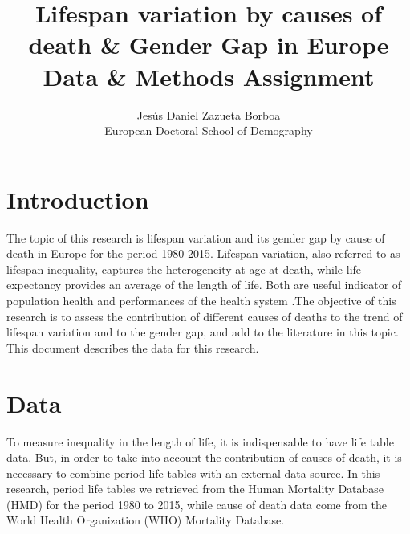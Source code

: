 \documentclass[12pt,a4paper]{article}
\begin{document}


\title{Lifespan variation by causes of death \& Gender Gap in Europe \\
        \small{Data \& Methods Assignment}}


\author{\large{Jesús Daniel Zazueta Borboa} \\ {\small{{European Doctoral School of Demography}}}}

\date{\small }
\maketitle
\vspace{-0.3in}


\section{Introduction}

The topic of this research is lifespan variation and its gender gap by cause of death in Europe for the period 1980-2015. Lifespan variation, also referred to as lifespan inequality, captures the heterogeneity at age at death, while life expectancy provides an average of the length of life. Both are useful indicator of population health and performances of the health system \citep{van18, JM2018-2}.The objective of this research is to assess the contribution of different causes of deaths to the trend of lifespan variation and to the gender gap, and add to the literature in this topic. This document describes the data for this research. 

\section{Data}

To measure inequality in the length of life, it is indispensable to have life table data. But, in order to take into account the contribution of causes of death, it is necessary to combine period life tables with an external data source. In this research, period life tables we retrieved from the Human Mortality Database (HMD) for the period 1980 to 2015, while cause of death data come from the World Health Organization  (WHO) Mortality Database. 
\end{document}
